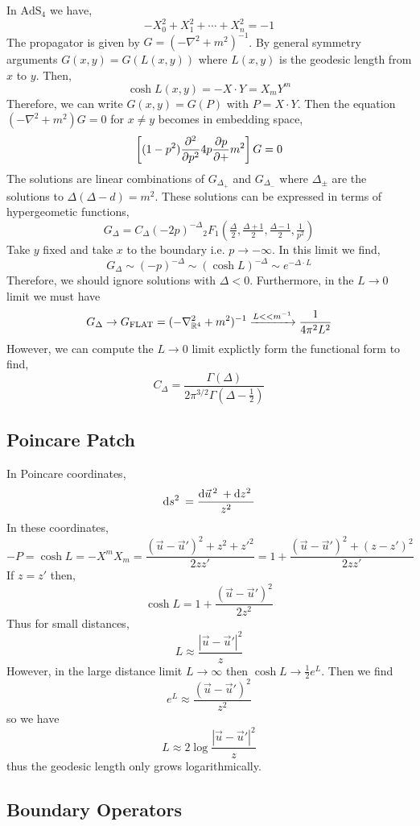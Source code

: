 \documentclass[12pt]{extarticle}
\newcommand{\AdS}[1]{\mathrm{AdS}_{#1}}
\begin{document}
In $\AdS{4}$ we have,
\[ - X_0^2 + X_1^2 + \cdots + X_n^2 = - 1\]
The propagator is given by $G = (-\nabla^2 + m^2)^{-1}$. By general symmetry arguments $G(x, y) = G(L(x,y))$  where $L(x, y)$ is the geodesic length from $x$ to $y$. Then,
\[ \cosh{L(x,y)} = - X \cdot Y = X_m Y^m \]
Therefore, we can write $G(x, y) = G(P)$ with $P = X \cdot Y$. Then the equation $(- \nabla^2 + m^2) G = 0$ for $x \neq y$ becomes in embedding space,
\[ \left[ (1 - p^2) \frac{\partial^2}{\partial p^2}  4 p \frac{\partial{p}}{\partial{+}} m^2 \right] G = 0 \]
The solutions are linear combinations of $G_{\Delta_+}$ and $G_{\Delta_{-}}$ where $\Delta_{\pm}$ are the solutions to $\Delta(\Delta - d) = m^2$. These solutions can be expressed in terms of hypergeometic functions,
\[ G_{\Delta} = C_\Delta (-2 p)^{-\Delta} {}_2F_1\left(\tfrac{\Delta}{2}, \tfrac{\Delta+1}{2}, \tfrac{\Delta-1}{2}, \tfrac{1}{p^2} \right) \]
Take $y$ fixed and take $x$ to the boundary i.e. $p \to - \infty$. In this limit we find,
\[ G_{\Delta} \sim (-p)^{-\Delta} \sim (\cosh{L})^{-\Delta} \sim e^{- \Delta \cdot L} \]
Therefore, we should ignore solutions with $\Delta < 0$. Furthermore, in the $L \to 0$ limit we must have 
\[ G_{\Delta} \to G_{\text{FLAT}} = (-\nabla_{\mathbb{R}^4}^2 + m^2)^{-1} \xrightarrow{L << m^{-1}} \frac{1}{4 \pi^2 L^2} \]
However, we can compute the $L \to 0$ limit explictly form the functional form to find,
\[ C_{\Delta} = \frac{\Gamma(\Delta)}{2 \pi^{3/2} \Gamma(\Delta - \tfrac{1}{2})} \]

\subsection{Poincare Patch}

In Poincare coordinates,
\[ \mathrm{d}s^2 \: = \frac{\mathrm{d}\vec{u}^{\, 2} \: + \mathrm{d}z^2 \:}{z^2} \]
In these coordinates,
\[ - P = \cosh{L} = - X^m X_m = \frac{(\vec{u} - \vec{u}')^2 +  z^2 + z'^2}{2 z z'} = 1 + \frac{(\vec{u} - \vec{u}')^2 + (z - z')^2}{2 z z'} \]
If $z = z'$ then,
\[ \cosh{L} = 1 + \frac{(\vec{u} - \vec{u}')^2}{2 z^2} \]
Thus for small distances,
\[ L \approx \frac{|\vec{u} - \vec{u}'|^2}{z} \]
However, in the large distance limit $L \to \infty$ then $\cosh{L} \to \tfrac{1}{2} e^L$. Then we find
\[ e^L \approx \frac{(\vec{u} - \vec{u}')^2}{z^2} \]
so we have 
\[ L \approx 2 \log{\frac{|\vec{u} - \vec{u}'|^2}{z}} \]
thus the geodesic length only grows logarithmically. 

\subsection{Boundary Operators}
\end{document}
